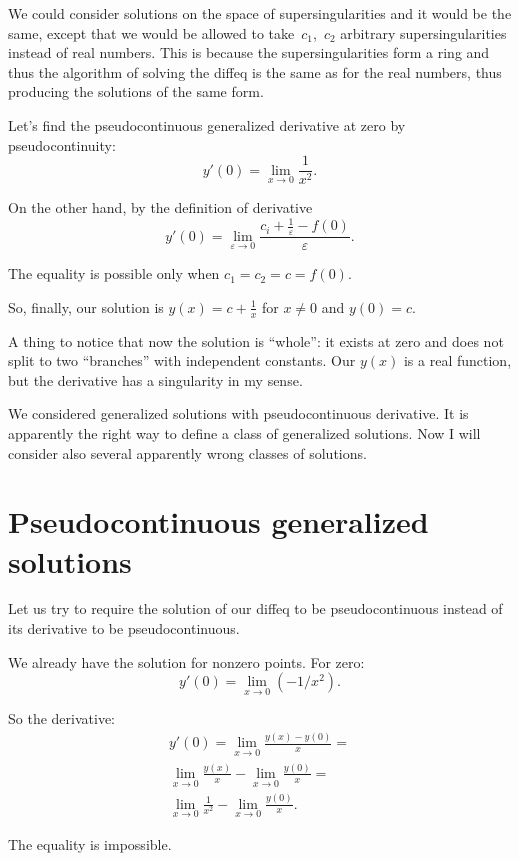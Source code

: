 \begin{rem}
We could consider solutions on the space of supersingularities and it would be the same, except that we would be allowed to take~$c_1$,~$c_2$ arbitrary supersingularities instead of real numbers. This is because the supersingularities form a ring and thus the algorithm of solving the diffeq is the same as for the real numbers, thus producing the solutions of the same form.
\end{rem}

Let's find the pseudocontinuous generalized derivative at zero by pseudocontinuity:
\[ y'(0) = \lim_{x\to 0} \frac{1}{x^2}. \]

On the other hand, by the definition of derivative
\[ y'(0) = \lim_{\varepsilon \rightarrow 0}  \frac{c_i + \frac{1}{\varepsilon} - f
(0)}{\varepsilon}. \]

The equality is possible only when $c_1=c_2=c=f(0)$.

So, finally, our solution is $y(x) = c + \frac{1}{x}$ for $x\ne 0$ and $y(0)=c$.

A thing to notice that now the solution is ``whole'': it exists at zero and does not split to two ``branches'' with independent constants. Our $y(x)$ is a real function, but the derivative has a singularity in my sense.

We considered generalized solutions with pseudocontinuous derivative. It is apparently the right way to define a class of generalized solutions. Now I will consider also several apparently wrong classes of solutions.

\section{Pseudocontinuous generalized solutions}

Let us try to require the solution of our diffeq to be pseudocontinuous instead of its derivative to be pseudocontinuous.

We already have the solution for nonzero points. For zero:
\[ y'(0) = \lim_{x\to 0}(-1/x^2). \]

So the derivative:
\begin{multline*}
y' (0) = \lim_{x\to 0} \frac{y(x) - y(0)}{x} =\\ \lim_{x\to 0} \frac{y(x)}{x} - \lim_{x\to 0} \frac{y(0)}{x} =\\ \lim_{x\to 0} \frac{1}{x^2} - \lim_{x\to 0} \frac{y(0)}{x}.
\end{multline*}

The equality is impossible.